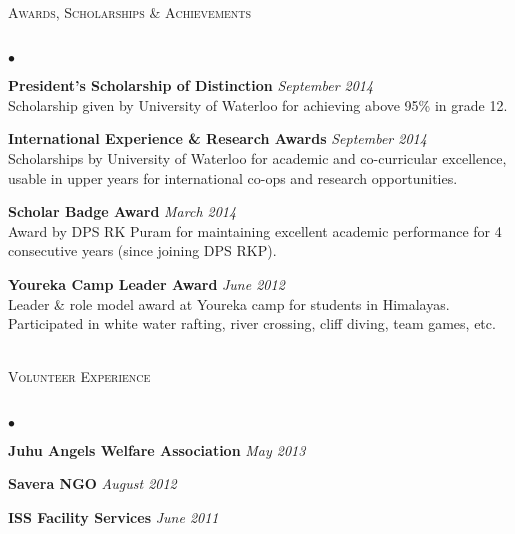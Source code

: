 \documentclass{article}
\newcommand{\lineunder}{\vspace*{-8pt} \\ \hspace*{-18pt} \hrulefill \\}
\newcommand{\header}[1]{{\hspace*{-15pt}\vspace*{6pt} \textsc{#1}} \vspace*{-6pt} \lineunder}
\newenvironment{achievements}{\begin{list}{$\bullet$}{\topsep 0pt \itemsep -1.5pt \leftmargin 5pt}}{\vspace*{4pt}\end{list}}
\begin{document}
\vspace{7pt}

\header{\normalsize Awards, Scholarships \& Achievements}
\begin{achievements}
\item \textbf{President's Scholarship of Distinction} \hfill \textit {September 2014}
\\ Scholarship given by University of Waterloo for achieving above 95\% in grade 12.
\item \textbf{International Experience \& Research Awards} \hfill \textit {September 2014}
\\ Scholarships by University of Waterloo for academic and co-curricular excellence, usable in upper years for international co-ops and research opportunities.
\item \textbf{Scholar Badge Award} \hfill \textit {March 2014}
\\ Award by DPS RK Puram for maintaining excellent academic performance for 4 consecutive years (since joining DPS RKP).
\item \textbf{Youreka Camp Leader Award} \hfill \textit {June 2012}
\\ Leader \& role model award at Youreka camp for students in Himalayas. Participated in white water rafting, river crossing, cliff diving, team games, etc. \\ \hspace*{-18pt}  \\
\end{achievements}

\header{\normalsize Volunteer Experience}
\begin{achievements}
\item \textbf{Juhu Angels Welfare Association}   \hfill \textit{May 2013}
\item \textbf{Savera NGO}     \hfill \textit{August 2012}
\item \textbf{ISS Facility Services}    \hfill \textit{June 2011}
\end{achievements}
\end{document}

